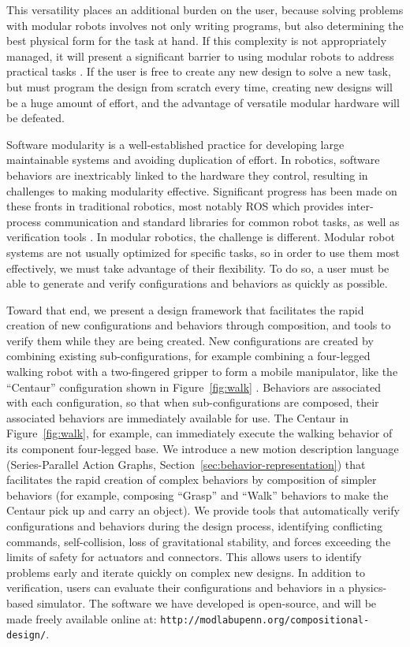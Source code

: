 \documentclass[graybox]{svmult}
\begin{document}
This versatility places an additional burden on the user, because
solving problems with modular robots involves not only writing  programs,
but also determining the best physical form for the task at hand. If this
complexity is not appropriately managed, it will present a significant barrier to
using modular robots to address practical tasks \cite{yim2000modular}. If the user is free to create any new design to
solve a new task, but must program the design from scratch every time, creating
new designs will be a huge amount of effort, and the advantage of versatile modular
hardware will be defeated.

Software modularity is a well-established practice for developing large
maintainable systems and avoiding duplication of effort. In robotics, software
behaviors are inextricably linked to the hardware they control, resulting in challenges to making modularity effective. Significant progress has been made on these fronts
in traditional robotics, most notably
ROS \cite{Quigley2009} which provides inter-process communication and standard libraries for common robot tasks,
as well as verification tools \cite{huang2014rosrv}.
In modular robotics, the challenge is different.  Modular robot systems are not usually
optimized
for specific tasks, so in order to use them most effectively, we must take advantage of their flexibility. To do
so, a user must be able to generate and verify configurations and behaviors
as quickly as possible.  

Toward that end, we present a design framework that facilitates the rapid creation
of new configurations
and behaviors through composition, and tools to verify them
while they are being created. New configurations are created by combining existing
sub-configurations,
for example combining a four-legged walking robot with a two-fingered gripper
to form a mobile manipulator, like the ``Centaur'' configuration shown in Figure~\ref{fig:walk}
.
Behaviors are associated with each configuration, so that when sub-configurations
are composed, their associated behaviors are immediately available for use.
The Centaur in Figure~\ref{fig:walk}, for example, can immediately execute the
walking behavior of its component four-legged base. We introduce a new motion description language (Series-Parallel Action Graphs,
Section~\ref{sec:behavior-representation})
that facilitates the rapid creation of complex behaviors by composition of simpler
behaviors (for example, composing  ``Grasp'' and ``Walk'' behaviors to make
the Centaur pick up and carry an object).
We provide tools that automatically verify configurations and behaviors during the
design process, 
identifying conflicting
commands, self-collision, loss of gravitational stability, and forces 
exceeding the limits of safety for actuators and connectors. This allows users
to identify problems early and iterate quickly on complex new designs. In addition to verification, users can  evaluate their configurations and behaviors in a physics-based simulator.
The software we have developed is open-source, and will be made freely available
online at: \texttt{http://modlabupenn.org/compositional-design/}.
\end{document}
